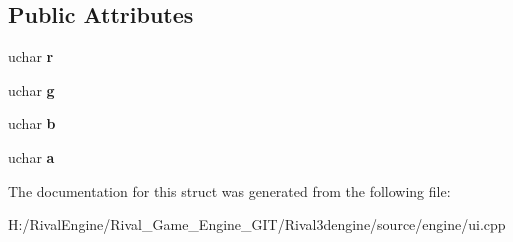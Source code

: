 \subsection*{Public Attributes}
\begin{DoxyCompactItemize}
\item 
\mbox{\label{struct_u_i_1_1_color_a6a140223690d8f675e9ccce0b106fa58}} 
uchar {\bfseries r}
\item 
\mbox{\label{struct_u_i_1_1_color_a4f80dcb2f1ca6e4b26159f2f043db255}} 
uchar {\bfseries g}
\item 
\mbox{\label{struct_u_i_1_1_color_a75c73d05dee66b6ff2ac287813d21e96}} 
uchar {\bfseries b}
\item 
\mbox{\label{struct_u_i_1_1_color_a884cb8b7293661142208d9f3de9ac2a3}} 
uchar {\bfseries a}
\end{DoxyCompactItemize}


The documentation for this struct was generated from the following file\+:\begin{DoxyCompactItemize}
\item 
H\+:/\+Rival\+Engine/\+Rival\+\_\+\+Game\+\_\+\+Engine\+\_\+\+G\+I\+T/\+Rival3dengine/source/engine/ui.\+cpp\end{DoxyCompactItemize}

